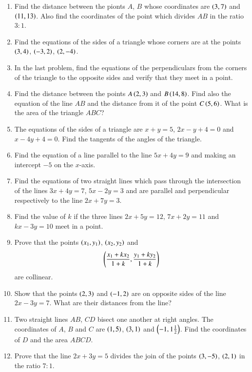 \renewcommand{\theequation}{\theenumi}
\begin{enumerate}[label=\arabic*.,ref=\thesubsection.\theenumi]
\item Find the distance between the pionts $A$, $B$ whose coordinates are $\left(3,7\right)$ and $\left(11,13\right)$.  Also
find the coordinates of the point which divides $AB$ in the ratio $3:1$.
\item Find the equations of the sides of a triangle whose corners are at the points
$\left(3,4\right)$, $\left(-3,2\right)$, $\left(2,-4\right)$.
\item In the last problem, find the equations of the perpendiculars from the corners of the triangle
to the opposite sides and verify that they meet in a point.
\item Find the distance between the points $A \left(2,3\right)$ and $B \left(14,8\right)$.  Find also the equation of the line $AB$ and
the distance from it of the point $C \left(5,6\right)$.  What is the area of the triangle $ABC$?
\item The equations of the sides of a triangle are $x+y=5$, $2x-y+4=0$ and $x-4y+4=0$.  Find the tangents of the angles of
the triangle.
\item Find the equation of a line parallel to the line $5x+4y=9$ and making an intercept $-5$ 
on the $x$-axis.
\item Find the equations of two straight lines which pass through the intersection
of the lines $3x+4y=7$, $5x-2y=3$ and are parallel and perpendicular respectively to the line $2x+7y=3$.
\item Find the value of $k$ if the three lines $2x+5y=12$, $7x+2y=11$ and $kx-3y=10$ meet in a point.
\item Prove that the points $\left(x_1,y_1\right)$, $\left(x_2,y_2\right)$ and
\begin{align*}
\left(\frac{x_1+kx_2}{1+k},\frac{y_1+ky_2}{1+k}\right)
\end{align*}
are collinear.
\item Show that the points $\left(2,3\right)$ and $\left(-1,2\right)$ are on opposite sides of the line $2x-3y=7$.  What are their distances from the line?
\item Two straight lines $AB$, $CD$ bisect one another at right angles.  The coordinates of $A$, $B$ and $C$ are
$\left(1,5\right)$, $\left(3,1\right)$ and $\left(-1,1\frac{1}{2}\right)$.  Find the coordinates of $D$ and the area $ABCD$.
\item Prove that the line $2x+3y=5$ divides the join of the points $\left(3,-5\right)$, $\left(2,1\right)$ in the ratio $7:1$.

\end{enumerate}
